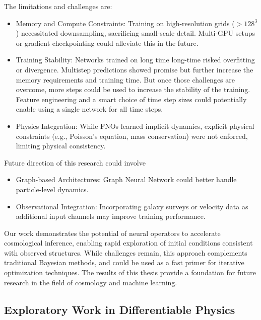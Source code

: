 \documentclass{article}
\begin{document}
{The limitations and challenges are:

\begin{itemize}
    \item Memory and Compute Constraints: Training on high-resolution grids ($>128^3$) necessitated downsampling, sacrificing small-scale detail. Multi-GPU setups or gradient checkpointing could alleviate this in the future.
    \item Training Stability: Networks trained on long time long-time risked overfitting or divergence. Multistep predictions showed promise but further increase the memory requirements and training time. But once those challenges are overcome, more steps could be used to increase the stability of the training. Feature engineering and a smart choice of time step sizes could potentially enable using a single network for all time steps.
    \item  Physics Integration: While FNOs learned implicit dynamics, explicit physical constraints (e.g., Poisson’s equation, mass conservation) were not enforced, limiting physical consistency.
\end{itemize}

Future direction of this research could involve

\begin{itemize}
    \item  Graph-based Architectures: Graph Neural Network could  better handle particle-level dynamics.
    \item Observational Integration: Incorporating galaxy surveys or velocity data as additional input channels may improve training performance.
\end{itemize}

Our work demonstrates the potential of neural operators to accelerate cosmological inference, enabling rapid exploration of initial conditions consistent with observed structures. While challenges remain, this approach complements traditional Bayesian methods, and could be used as a fast primer for iterative optimization techniques. The results of this thesis provide a foundation for future research in the field of cosmology and machine learning.
\newpage

\begin{appendices}

\section{Exploratory Work in Differentiable Physics}


\end{appendices}}
\end{document}
